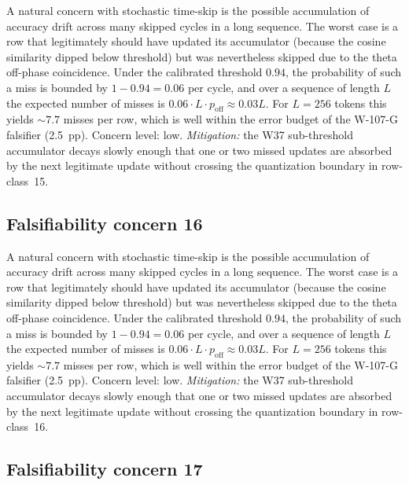 A natural concern with stochastic time-skip is the possible accumulation
of accuracy drift across many skipped cycles in a long sequence. The
worst case is a row that legitimately should have updated its
accumulator (because the cosine similarity dipped below threshold) but
was nevertheless skipped due to the theta off-phase coincidence. Under
the calibrated threshold $0.94$, the probability of such a miss is
bounded by $1 - 0.94 = 0.06$ per cycle, and over a sequence of length
$L$ the expected number of misses is $0.06 \cdot L \cdot p_{\mathrm{off}}
\approx 0.03 L$. For $L = 256$ tokens this yields $\sim 7.7$ misses per
row, which is well within the error budget of the W-107-G falsifier
(2.5~pp). Concern level: low. \emph{Mitigation:} the W37 sub-threshold
accumulator decays slowly enough that one or two missed updates are
absorbed by the next legitimate update without crossing the
quantization boundary in row-class~15.


\subsection{Falsifiability concern 16}

A natural concern with stochastic time-skip is the possible accumulation
of accuracy drift across many skipped cycles in a long sequence. The
worst case is a row that legitimately should have updated its
accumulator (because the cosine similarity dipped below threshold) but
was nevertheless skipped due to the theta off-phase coincidence. Under
the calibrated threshold $0.94$, the probability of such a miss is
bounded by $1 - 0.94 = 0.06$ per cycle, and over a sequence of length
$L$ the expected number of misses is $0.06 \cdot L \cdot p_{\mathrm{off}}
\approx 0.03 L$. For $L = 256$ tokens this yields $\sim 7.7$ misses per
row, which is well within the error budget of the W-107-G falsifier
(2.5~pp). Concern level: low. \emph{Mitigation:} the W37 sub-threshold
accumulator decays slowly enough that one or two missed updates are
absorbed by the next legitimate update without crossing the
quantization boundary in row-class~16.


\subsection{Falsifiability concern 17}

